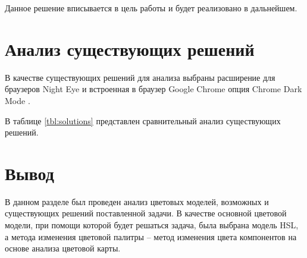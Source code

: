 Данное решение вписывается в цель работы и будет реализовано в дальнейшем.

\section{Анализ существующих решений}

В качестве существующих решений для анализа выбраны расширение для браузеров Night Eye \cite{nighteye} и встроенная в браузер Google Chrome \cite{chrome} опция Chrome Dark Mode \cite{chromedarkmode}.

В таблице \ref{tbl:solutions} представлен сравнительный анализ существующих решений.

\begin{table}[H]
	\caption{Анализ существующих решений}
	\centering
\end{table}

\section*{Вывод}

В данном разделе был проведен анализ цветовых моделей, возможных и существующих решений поставленной задачи. В качестве основной цветовой модели, при помощи которой будет решаться задача, была выбрана модель HSL, а метода изменения цветовой палитры -- метод изменения цвета компонентов на основе анализа цветовой карты.